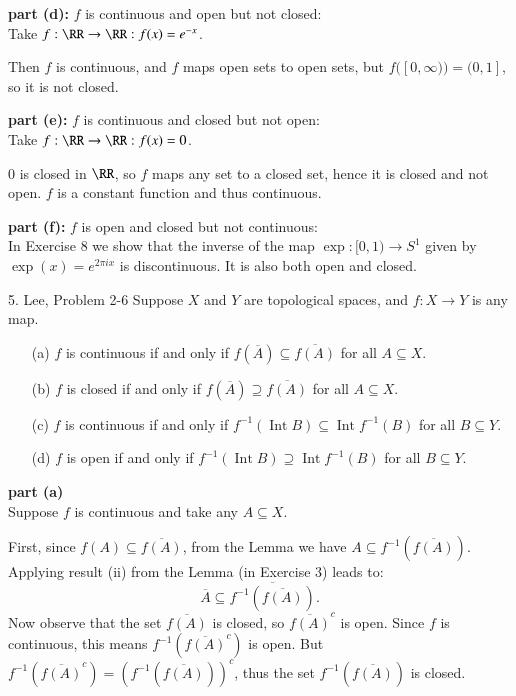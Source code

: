 \documentclass{homework}
\newcommand{\ra}{\rightarrow}
\DeclareMathOperator{\Int}{\mathrm{Int}}
\begin{document}
\textbf{part (d): } $f$ is continuous and open but not closed:\\
Take $f:\RR\ra\RR: f(x)=e^{-x}$.

Then $f$ is continuous, and $f$ maps open sets to open sets, but
$f([0,\infty)) = (0,1]$, so it is not closed.

\textbf{part (e): } $f$ is continuous and closed but not open:\\
Take $f:\RR\ra\RR: f(x)=0$.

${0}$ is closed in $\RR$, so $f$ maps any set to a closed set, hence it
is closed and not open.  $f$ is a constant function and thus continuous.

\textbf{part (f): } $f$ is open and closed but not continuous:\\
In Exercise 8 we show that the inverse of the map $\exp : [0,1)\rightarrow S^1$
given by $\exp(x)=e^{2\pi ix}$ is discontinuous.  It is also both
open and closed.

\hrulefill
\begin{exercise}{5. Lee, Problem 2-6}
Suppose $X$ and $Y$ are topological spaces, and $f:X\ra Y$ is any map.
\begin{itemize}
\item[(a)] $f$ is continuous if and only if $f(\overline{A})\subseteq\overline{f(A)}$
for all $A\subseteq X$.
\item[(b)] $f$ is closed if and only if $f(\overline{A})\supseteq\overline{f(A)}$
for all $A\subseteq X$.
\item[(c)] $f$ is continuous if and only if $f^{-1}(\Int B)\subseteq\Int f^{-1}(B)$
for all $B\subseteq Y$.
\item[(d)] $f$ is open if and only if $f^{-1}(\Int B)\supseteq\Int f^{-1}(B)$
for all $B\subseteq Y$.
\end{itemize}
\end{exercise}
\solution
\textbf{part (a)}\\
Suppose $f$ is continuous and take any $A\subseteq X$.

First, since
$f(A)\subseteq \overline{f(A)}$, from the Lemma we
have $A\subseteq f^{-1}(\overline{f(A)})$.  Applying result (ii) from the
Lemma (in Exercise 3) leads to:
\begin{equation}
\overline{A} \subseteq \overline{f^{-1}(\overline{f(A)})}. \label{5a1}
\end{equation}
Now observe that the set $\overline{f(A)}$ is
closed, so $\overline{f(A)}^c$ is open.  Since $f$ is continuous, this
means $f^{-1}(\overline{f(A)}^c)$ is open. But
$f^{-1}(\overline{f(A)}^c) = \left( f^{-1}(\overline{f(A)}) \right)^c$, thus
the set $f^{-1}(\overline{f(A)})$ is closed.
\end{document}
